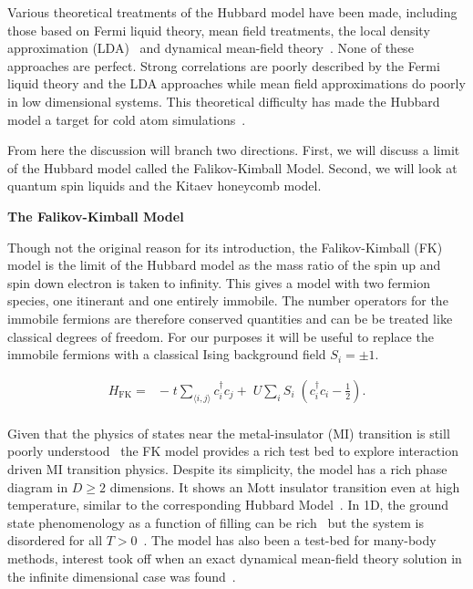 Various theoretical treatments of the Hubbard model have been made, including those based on Fermi liquid theory, mean field treatments, the local density approximation (LDA)~\autocite{slaterMagneticEffectsHartreeFock1951} and dynamical mean-field theory~\autocite{greinerQuantumPhaseTransition2002}. None of these approaches are perfect. Strong correlations are poorly described by the Fermi liquid theory and the LDA approaches while mean field approximations do poorly in low dimensional systems. This theoretical difficulty has made the Hubbard model a target for cold atom simulations~\autocite{mazurenkoColdatomFermiHubbard2017}.

From here the discussion will branch two directions. First, we will discuss a limit of the Hubbard model called the Falikov-Kimball Model. Second, we will look at quantum spin liquids and the Kitaev honeycomb model.

\textbf{The Falikov-Kimball Model}

Though not the original reason for its introduction, the Falikov-Kimball (FK) model is the limit of the Hubbard model as the mass ratio of the spin up and spin down electron is taken to infinity. This gives a model with two fermion species, one itinerant and one entirely immobile. The number operators for the immobile fermions are therefore conserved quantities and can be be treated like classical degrees of freedom. For our purposes it will be useful to replace the immobile fermions with a classical Ising background field \(S_i = \pm1\).

\[\begin{aligned}
H_{\mathrm{FK}} = & -\;t \sum_{\langle i,j \rangle} c^\dagger_{i}c_{j} + \;U \sum_{i} S_i\;(c^\dagger_{i}c_{i} - \tfrac{1}{2}). \\ 
\end{aligned}\]

Given that the physics of states near the metal-insulator (MI) transition is still poorly understood~\autocite{belitzAndersonMottTransition1994,baskoMetalInsulatorTransition2006} the FK model provides a rich test bed to explore interaction driven MI transition physics. Despite its simplicity, the model has a rich phase diagram in \(D \geq 2\) dimensions. It shows an Mott insulator transition even at high temperature, similar to the corresponding Hubbard Model~\autocite{brandtThermodynamicsCorrelationFunctions1989}. In 1D, the ground state phenomenology as a function of filling can be rich~\autocite{gruberGroundStatesSpinless1990} but the system is disordered for all \(T > 0\)~\autocite{kennedyItinerantElectronModel1986}. The model has also been a test-bed for many-body methods, interest took off when an exact dynamical mean-field theory solution in the infinite dimensional case was found~\autocite{antipovCriticalExponentsStrongly2014,ribicNonlocalCorrelationsSpectral2016,freericksExactDynamicalMeanfield2003,herrmannNonequilibriumDynamicalCluster2016}.

